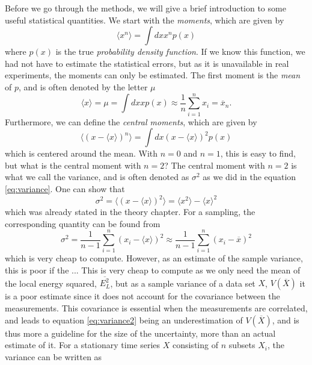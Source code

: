 Before we go through the methods, we will give a brief introduction to some useful statistical quantities. We start with the \textit{moments}, which are given by
\begin{equation*}
\langle x^n\rangle=\int dxx^np(x)
\end{equation*}
where $p(x)$ is the true \textit{probability density function}. If we know this function, we had not have to estimate the statistical errors, but as it is unavailable in real experiments, the moments can only be estimated. The first moment is the \textit{mean} of $p$, and is often denoted by the letter $\mu$
\begin{equation}
\langle x\rangle=\mu=\int dxxp(x)\approx \frac{1}{n}\sum_{i=1}^n x_i=\overline{x}_n.
\end{equation}
Furthermore, we can define the \textit{central moments}, which are given by
\begin{equation}
\langle(x-\langle x\rangle)^n\rangle=\int dx(x-\langle x\rangle)^2p(x)
\end{equation}
which is centered around the mean. With $n=0$ and $n=1$, this is easy to find, but what is the central moment with $n=2$? The central moment with $n=2$ is what we call the variance, and is often denoted as $\sigma^2$ as we did in the equation \eqref{eq:variance}. One can show that
\begin{equation}
\sigma^2=\langle(x-\langle x\rangle)^2\rangle=\langle x^2\rangle - \langle x \rangle^2
\label{eq:variance2}
\end{equation}
which was already stated in the theory chapter. For a sampling, the corresponding quantity can be found from
\begin{equation}
\sigma^2=\frac{1}{n-1}\sum_{i=1}^n(x_i-\langle x\rangle)^2\approx \frac{1}{n-1}\sum_{i=1}^n(x_i-\overline{x})^2
\end{equation}
which is very cheap to compute. However, as an estimate of the sample variance, this is poor if the ...
This is very cheap to compute as we only need the mean of the local energy squared, $\overline{E_L^2}$, but as a sample variance of a data set $X$, $V(\overline{X})$ it is a poor estimate since it does not account for the covariance between the measurements. This covariance is essential when the measurements are correlated, and leads to equation \eqref{eq:variance2} being an underestimation of $V(\overline{X})$, and is thus more a guideline for the size of the uncertainty, more than an actual estimate of it. For a stationary time series $X$ consisting of $n$ subsets $X_i$, the variance can be written as
